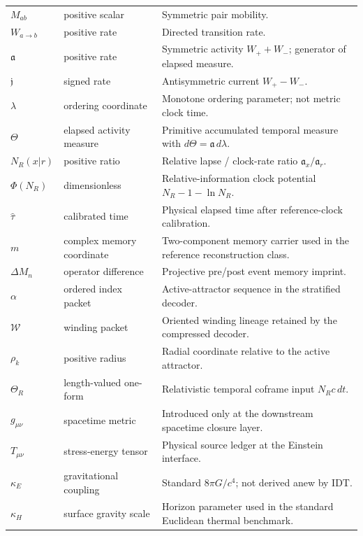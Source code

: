 \begin{longtable}{p{}p{}p{}}
\(M_{ab}\) & positive scalar & Symmetric pair mobility. \\
\(W_{a\to b}\) & positive rate & Directed transition rate. \\
\(\mathfrak a\) & positive rate & Symmetric activity \(W_++W_-\); generator of elapsed measure. \\
\(\mathfrak j\) & signed rate & Antisymmetric current \(W_+-W_-\). \\
\(\lambda\) & ordering coordinate & Monotone ordering parameter; not metric clock time. \\
\(\Theta\) & elapsed activity measure & Primitive accumulated temporal measure with \(d\Theta=\mathfrak a\,d\lambda\). \\
\(N_R(x|r)\) & positive ratio & Relative lapse / clock-rate ratio \(\mathfrak a_x/\mathfrak a_r\). \\
\(\Phi(N_R)\) & dimensionless & Relative-information clock potential \(N_R-1-\ln N_R\). \\
\(\widehat\tau\) & calibrated time & Physical elapsed time after reference-clock calibration. \\
\(m\) & complex memory coordinate & Two-component memory carrier used in the reference reconstruction class. \\
\(\Delta M_n\) & operator difference & Projective pre/post event memory imprint. \\
\(\alpha\) & ordered index packet & Active-attractor sequence in the stratified decoder. \\
\(\mathcal W\) & winding packet & Oriented winding lineage retained by the compressed decoder. \\
\(\rho_k\) & positive radius & Radial coordinate relative to the active attractor. \\
\(\Theta_R\) & length-valued one-form & Relativistic temporal coframe input \(N_Rc\,dt\). \\
\(g_{\mu\nu}\) & spacetime metric & Introduced only at the downstream spacetime closure layer. \\
\(T_{\mu\nu}\) & stress-energy tensor & Physical source ledger at the Einstein interface. \\
\(\kappa_E\) & gravitational coupling & Standard \(8\pi G/c^4\); not derived anew by IDT. \\
\(\kappa_H\) & surface gravity scale & Horizon parameter used in the standard Euclidean thermal benchmark. \\
\bottomrule
\end{longtable}
\normalsize

